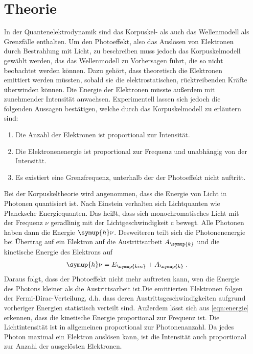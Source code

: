 \section{Theorie}
\label{sec:Theorie}

In der Quantenelektrodynamik sind das Korpuskel- als auch das Wellenmodell als Grenzfälle enthalten.
Um den Photoeffekt, also das Auslösen von Elektronen durch Bestrahlung mit Licht, zu beschreiben 
muss jedoch das Korpuskelmodell gewählt werden, das das Wellenmodell zu Vorhersagen führt, die so nicht 
beobachtet werden können. Dazu gehört, dass theoretisch die Elektronen emittiert werden müssten, sobald sie 
die elektrostatischen, rücktreibenden Kräfte überwinden können. Die Energie der Elektronen müsste außerdem 
mit zunehmender Intensität anwachsen. Experimentell lassen sich jedoch die folgenden Aussagen bestätigen, 
welche durch das Korpuskelmodell zu erläutern sind: 
 \begin{enumerate}
    \item Die Anzahl der Elektronen ist proportional zur Intensität.
    \item Die Elektronenenergie ist proportional zur Frequenz und unabhängig von der Intensität.
    \item Es existiert eine Grenzfrequenz, unterhalb der der Photoeffekt nicht auftritt. 
 \end{enumerate}

 Bei der Korpuskeltheorie wird angenommen, dass die Energie von Licht in Photonen quantisiert ist.
 Nach Einstein verhalten sich Lichtquanten wie Plancksche Energiequanten. Das heißt, dass sich 
 monochromatisches Licht mit der Frequenz $\nu$ geradlinig mit der Lichtgeschwindigkeit c bewegt. 
 Alle Photonen haben dann die Energie $\symup{h}\nu$. Desweiteren teilt sich die Photonenenergie bei 
 Übertrag auf ein Elektron auf die Austrittsarbeit $A_{\symup{k}}$ und die kinetische Energie des 
 Elektrons auf
\begin{equation}
    \symup{h} \nu = E_{\symup{kin}} + A_{\symup{k}} \; .
    \label{eqn:energie}
\end{equation}
Daraus folgt, dass der Photoeffekt nicht mehr auftreten kann, wen die Energie des Photons 
kleiner als die Austrittsarbeit ist.Die emittierten Elektronen folgen der Fermi-Dirac-Verteilung, d.h. 
dass deren Austrittsgeschwindigkeiten aufgrund vorheriger Energien statistisch verteilt sind.
 Außerdem lässt sich aus \autoref{eqn:energie} erkennen, 
dass die kinetische Energie proportional zur Frequenz ist. Die Lichtintensität ist in allgemeinen 
proportional zur Photonenanzahl. Da jedes Photon maximal ein Elektron auslösen kann, ist die Intensität 
auch proportional zur Anzahl der ausgelösten Elektronen.

